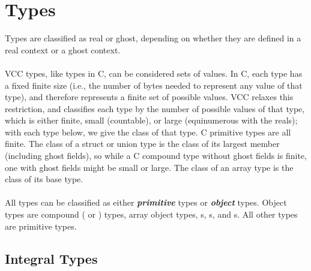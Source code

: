 \documentclass[preprint,nocopyrightspace]{sigplanconf}
\newcommand{\Def}[1]{\textit{\textbf{#1}}}
\begin{document}
{{\section{Types}
\label{sec:types}
Types are classified as real or ghost, depending on whether they are
defined in a real context or a ghost context.  
\\\\
VCC types, like types in C, can be considered sets of values. In C,
each type has a fixed finite size (i.e., the number of bytes needed to
represent any value of that type), and therefore represents a finite
set of possible values. VCC relaxes this restriction, and classifies
each type by the number of possible values of that type, which is
either finite, small (countable), or large (equinumerous with the
reals); with each type below, we give the class of that type. C
primitive types are all finite. The class of a struct or union type is
the class of its largest member (including ghost fields), so while a C
compound type without ghost fields is finite, one with ghost fields
might be small or large. The class of an array type is the class of
its base type.
\\\\
All types can be classified as either \Def{primitive} types
or \Def{object} types. Object types are compound (
or ) types, array object types, \vcc{\thread}s, 
\vcc{\claim}s, and \vcc{\blob}s. All other types are primitive types.

\subsection{Integral Types}

}}
\end{document}
